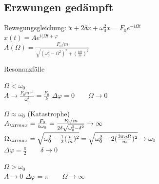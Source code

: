 \documentclass[german]{latex4ei/latex4ei_sheet}
\begin{document}
\begin{sectionbox}
\subsection{Erzwungen gedämpft}
Bewegungsgleichung: $\ddot{x}+2\delta \dot{x}+\omega_0^2x=F_0e^{-i\Omega t}$\\
$\hat{x}(t)=Ae^{i(\Omega t + \varphi}$\\
$A(\Omega)=\frac{F_0/m}{\sqrt{(\omega_0^2-\Omega^2)^2+(\frac{b\Omega}{m})^2}}$\\
\begin{cookbox}{Resonanzfälle}
	\item $\Omega < \omega_0$\\
		$A\rightarrow \frac{F_0m^{-1}}{\omega_0^2}=\frac{F_0}{k}$\qquad
		$\Delta \varphi = 0 \qquad \Omega \rightarrow 0$
	\item $\Omega \approx \omega_0$ (Katastrophe)\\
		$A_{\ir max}=\frac{F_0}{b\omega_0}=\frac{F_0/m}{2\delta \sqrt{\omega_0^2-\delta^2}} \rightarrow \infty$\\
		$\Omega_{\ir max}=\sqrt{\omega_0^2-\frac{1}{2}(\frac{b}{m})^2}=\sqrt{\omega_0^2-2(\frac{3\pi \eta R}{m})^2}\rightarrow \omega_0$\\
		$\Delta \varphi = \frac{\pi}{2} \qquad \delta \rightarrow 0$
		\item $\Omega > \omega_0$\\
		$A\rightarrow 0$\qquad
		$\Delta \varphi = \pi \qquad \Omega \rightarrow \infty$
\end{cookbox}
\end{sectionbox}

\end{document}
